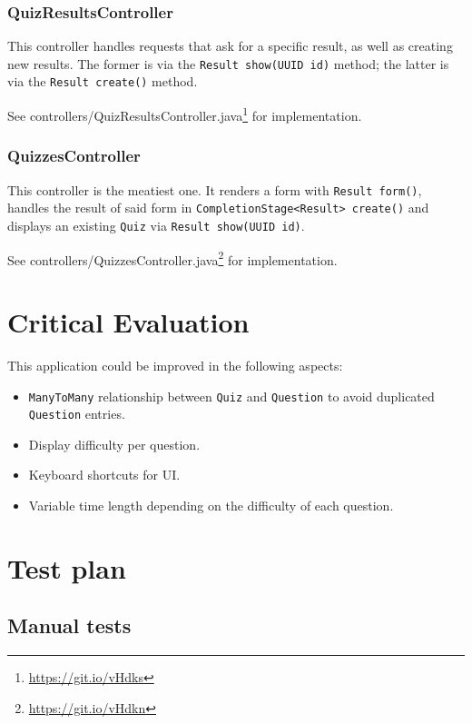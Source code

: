 \documentclass[english,a4paper,]{report}
\renewcommand{\href}[2]{#2\footnote{\url{#1}}}
\providecommand{\tightlist}{%
  \setlength{\itemsep}{0pt}\setlength{\parskip}{0pt}}
\begin{document}
\subsection{QuizResultsController}\label{quizresultscontroller}

This controller handles requests that ask for a specific result, as well
as creating new results. The former is via the
\texttt{Result\ show(UUID\ id)} method; the latter is via the
\texttt{Result\ create()} method.

See \href{https://git.io/vHdks}{controllers/QuizResultsController.java}
for implementation.

\subsection{QuizzesController}\label{quizzescontroller}

This controller is the meatiest one. It renders a form with
\texttt{Result\ form()}, handles the result of said form in
\texttt{CompletionStage\textless{}Result\textgreater{}\ create()} and
displays an existing \texttt{Quiz} via \texttt{Result\ show(UUID\ id)}.

See \href{https://git.io/vHdkn}{controllers/QuizzesController.java} for
implementation.

\chapter{Critical Evaluation}\label{critical-evaluation}

This application could be improved in the following aspects:

\begin{itemize}
\tightlist
\item
  \texttt{ManyToMany} relationship between \texttt{Quiz} and
  \texttt{Question} to avoid duplicated \texttt{Question} entries.
\item
  Display difficulty per question.
\item
  Keyboard shortcuts for UI.
\item
  Variable time length depending on the difficulty of each question.
\end{itemize}

\chapter{Test plan}\label{test-plan}

\section{Manual tests}\label{manual-tests}
\end{document}
